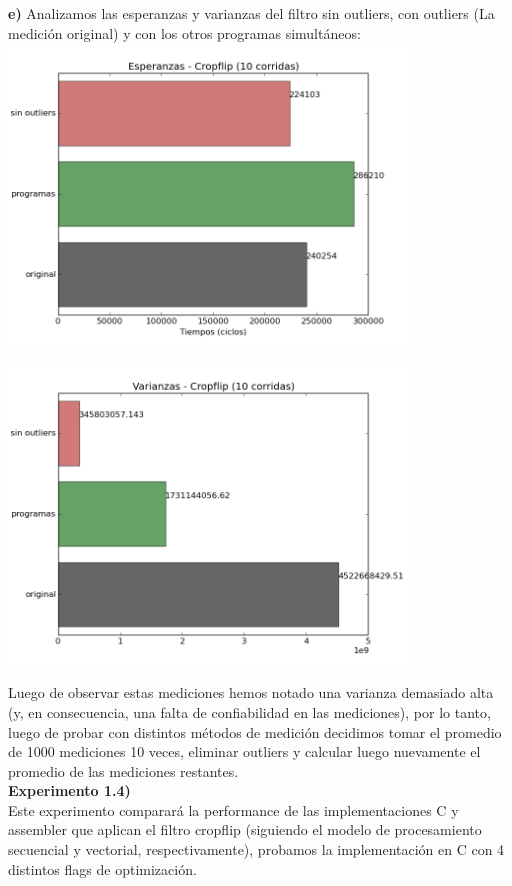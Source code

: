 \documentclass[a4paper]{article}
\begin{document}
\noindent \textbf{e)} Analizamos las esperanzas y varianzas del filtro sin outliers, con outliers (La medición original) y con los otros programas simultáneos:\\
\includegraphics[width=300pt]{imagenes/esperanzas.png}

\includegraphics[width=300pt]{imagenes/varianzas.png}

Luego de observar estas mediciones hemos notado una varianza demasiado alta (y, en consecuencia, una falta de confiabilidad en las mediciones), por lo tanto, luego de probar con distintos m\'{e}todos de medici\'{o}n decidimos tomar el promedio de 1000 mediciones 10 veces, eliminar outliers y calcular luego nuevamente el promedio de las mediciones restantes. \\

\textbf{Experimento 1.4)}\\
Este experimento comparar\'{a} la performance de las implementaciones C y assembler que aplican el filtro cropflip (siguiendo el modelo de procesamiento secuencial y vectorial, respectivamente), probamos la implementaci\'{o}n en C con 4 distintos flags de optimizaci\'{o}n.
\end{document}
